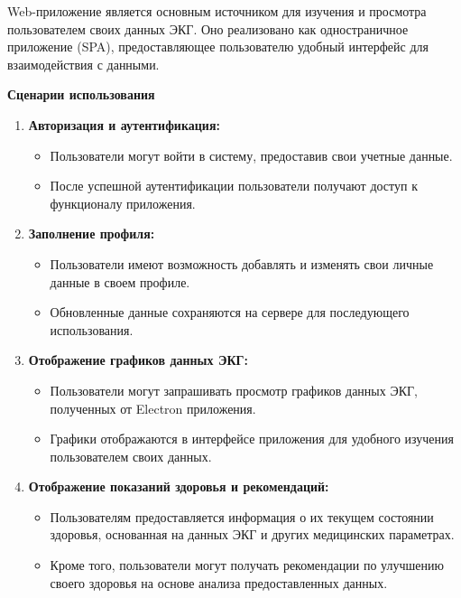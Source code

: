 \documentclass[12pt, russian]{extarticle}
\begin{document}
\begin{spacing}{1.5}
Web-приложение является основным источником для изучения и просмотра пользователем своих данных ЭКГ. Оно реализовано как одностраничное приложение (SPA), предоставляющее пользователю удобный интерфейс для взаимодействия с данными. 

\par \noindent \textbf{Сценарии использования}

\begin{enumerate}
    \item \textbf{Авторизация и аутентификация:}
    \begin{itemize}
        \item Пользователи могут войти в систему, предоставив свои учетные данные.
        \item После успешной аутентификации пользователи получают доступ к функционалу приложения.
    \end{itemize}

    \item \textbf{Заполнение профиля:}
    \begin{itemize}
        \item Пользователи имеют возможность добавлять и изменять свои личные данные в своем профиле.
        \item Обновленные данные сохраняются на сервере для последующего использования.
    \end{itemize}

    \item \textbf{Отображение графиков данных ЭКГ:}
    \begin{itemize}
        \item Пользователи могут запрашивать просмотр графиков данных ЭКГ, полученных от Electron приложения.
        \item Графики отображаются в интерфейсе приложения для удобного изучения пользователем своих данных.
    \end{itemize}

    \item \textbf{Отображение показаний здоровья и рекомендаций:}
    \begin{itemize}
        \item Пользователям предоставляется информация о их текущем состоянии здоровья, основанная на данных ЭКГ и других медицинских параметрах.
        \item Кроме того, пользователи могут получать рекомендации по улучшению своего здоровья на основе анализа предоставленных данных.
    \end{itemize}
\end{enumerate}


\end{spacing}
\end{document}
